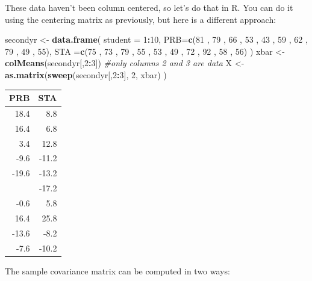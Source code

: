 \documentclass[]{book}
\newenvironment{Shaded}{\begin{snugshade}}{\end{snugshade}}
\newcommand{\CommentTok}[1]{\textcolor[rgb]{0.56,0.35,0.01}{\textit{#1}}}
\newcommand{\DataTypeTok}[1]{\textcolor[rgb]{0.13,0.29,0.53}{#1}}
\newcommand{\DecValTok}[1]{\textcolor[rgb]{0.00,0.00,0.81}{#1}}
\newcommand{\KeywordTok}[1]{\textcolor[rgb]{0.13,0.29,0.53}{\textbf{#1}}}
\newcommand{\NormalTok}[1]{#1}
\newcommand{\OperatorTok}[1]{\textcolor[rgb]{0.81,0.36,0.00}{\textbf{#1}}}
\newcommand{\StringTok}[1]{\textcolor[rgb]{0.31,0.60,0.02}{#1}}
\theoremstyle{definition}
\theoremstyle{definition}
\theoremstyle{definition}
\theoremstyle{remark}
\begin{document}
These data haven't been column centered, so let's do that in R. You can do it using the centering matrix as previously, but here is a different approach:

\begin{Shaded}
\begin{Highlighting}[]
\NormalTok{secondyr <-}\StringTok{ }\KeywordTok{data.frame}\NormalTok{(}
  \DataTypeTok{student =} \DecValTok{1}\OperatorTok{:}\DecValTok{10}\NormalTok{,}
\DataTypeTok{PRB=}\KeywordTok{c}\NormalTok{(}\DecValTok{81}\NormalTok{ , }\DecValTok{79}\NormalTok{ , }\DecValTok{66}\NormalTok{ , }\DecValTok{53}\NormalTok{ , }\DecValTok{43}\NormalTok{ , }\DecValTok{59}\NormalTok{ , }\DecValTok{62}\NormalTok{ , }\DecValTok{79}\NormalTok{ , }\DecValTok{49}\NormalTok{ , }\DecValTok{55}\NormalTok{),}
\DataTypeTok{STA =}\KeywordTok{c}\NormalTok{(}\DecValTok{75}\NormalTok{ , }\DecValTok{73}\NormalTok{ , }\DecValTok{79}\NormalTok{ , }\DecValTok{55}\NormalTok{ , }\DecValTok{53}\NormalTok{ , }\DecValTok{49}\NormalTok{ , }\DecValTok{72}\NormalTok{ , }\DecValTok{92}\NormalTok{ , }\DecValTok{58}\NormalTok{ , }\DecValTok{56}\NormalTok{)}
\NormalTok{        )}
\NormalTok{xbar <-}\StringTok{ }\KeywordTok{colMeans}\NormalTok{(secondyr[,}\DecValTok{2}\OperatorTok{:}\DecValTok{3}\NormalTok{]) }\CommentTok{#only columns 2 and 3 are data}
\NormalTok{X <-}\StringTok{ }\KeywordTok{as.matrix}\NormalTok{(}\KeywordTok{sweep}\NormalTok{(secondyr[,}\DecValTok{2}\OperatorTok{:}\DecValTok{3}\NormalTok{], }\DecValTok{2}\NormalTok{, xbar) )}
\end{Highlighting}
\end{Shaded}

\begin{table}[H]
\centering
\begin{tabular}{rr}
\toprule
PRB & STA\\
\midrule
18.4 & 8.8\\
16.4 & 6.8\\
3.4 & 12.8\\
-9.6 & -11.2\\
-19.6 & -13.2\\
\addlinespace
-3.6 & -17.2\\
-0.6 & 5.8\\
16.4 & 25.8\\
-13.6 & -8.2\\
-7.6 & -10.2\\
\bottomrule
\end{tabular}
\end{table}

The sample covariance matrix can be computed in two ways:
\end{document}
